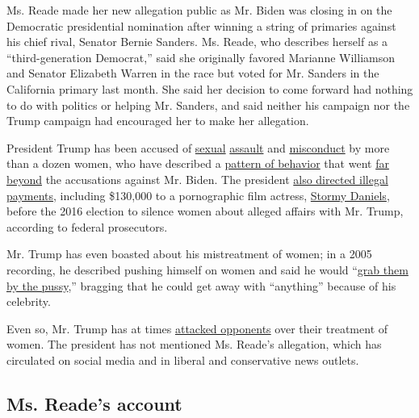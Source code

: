 Ms. Reade made her new allegation public as Mr. Biden was closing in on
the Democratic presidential nomination after winning a string of
primaries against his chief rival, Senator Bernie Sanders. Ms. Reade,
who describes herself as a ``third-generation Democrat,'' said she
originally favored Marianne Williamson and Senator Elizabeth Warren in
the race but voted for Mr. Sanders in the California primary last month.
She said her decision to come forward had nothing to do with politics or
helping Mr. Sanders, and said neither his campaign nor the Trump
campaign had encouraged her to make her allegation.

President Trump has been accused of
\href{https://www.nytimes3xbfgragh.onion/2017/01/17/us/former-apprentice-contestant-files-defamation-suit-against-trump.html}{sexual}
\href{https://www.nytimes3xbfgragh.onion/2019/06/24/us/politics/jean-carroll-trump.html}{assault}
and
\href{https://www.nytimes3xbfgragh.onion/2016/10/13/us/politics/donald-trump-women.html}{misconduct}
by more than a dozen women, who have described a
\href{https://www.nytimes3xbfgragh.onion/2016/10/21/us/politics/donald-trump-women.html}{pattern
of behavior} that went
\href{https://www.nytimes3xbfgragh.onion/2020/01/30/nyregion/e-jean-carroll-trump-dna.html}{far
beyond} the accusations against Mr. Biden. The president
\href{https://www.nytimes3xbfgragh.onion/2018/12/07/nyregion/michael-cohen-sentence.html}{also
directed illegal payments}, including \$130,000 to a pornographic film
actress,
\href{https://www.nytimes3xbfgragh.onion/2018/08/27/nyregion/stormy-daniels-trump-payment.html}{Stormy
Daniels}, before the 2016 election to silence women about alleged
affairs with Mr. Trump, according to federal prosecutors.

Mr. Trump has even boasted about his mistreatment of women; in a 2005
recording, he described pushing himself on women and said he would
``\href{https://www.nytimes3xbfgragh.onion/2016/10/08/us/donald-trump-tape-transcript.html}{grab
them by the pussy},'' bragging that he could get away with ``anything''
because of his celebrity.

Even so, Mr. Trump has at times
\href{https://www.nytimes3xbfgragh.onion/2016/10/10/us/politics/bill-clinton-accusers.html}{attacked
opponents} over their treatment of women. The president has not
mentioned Ms. Reade's allegation, which has circulated on social media
and in liberal and conservative news outlets.

\hypertarget{ms-reades-account}{%
\subsection{Ms. Reade's account}\label{ms-reades-account}}

